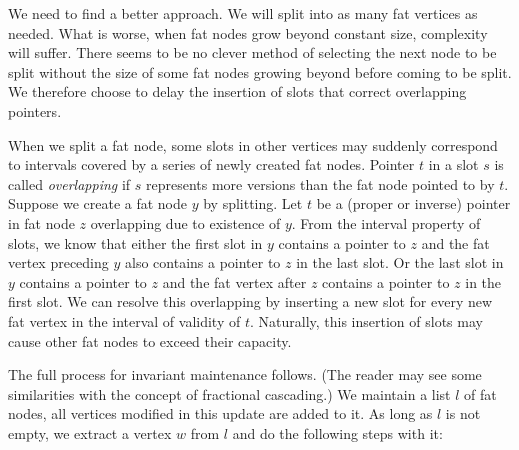 We need to find a better approach. 
We will split into as many fat vertices as needed. 
What is worse, when fat nodes grow beyond constant size, complexity will suffer. 
There seems to be no clever method of selecting the next node to be split without the size of some fat nodes growing beyond  before coming to be split. 
We therefore choose to delay the insertion of slots that correct overlapping pointers.

When we split a fat node, some slots in other vertices may suddenly correspond to intervals covered by a series of newly created fat nodes. Pointer $t$ in a slot $s$ is called \emph{overlapping} if $s$ represents more versions than the fat node pointed to by $t$.
Suppose we create a fat node $y$ by splitting. 
Let $t$ be a (proper or inverse) pointer in fat node $z$ overlapping due to existence of $y$. 
From the interval property of slots, we know that either the first slot in $y$ contains a pointer to $z$ and the fat vertex preceding $y$ also contains a pointer to $z$ in the last slot. 
Or the last slot in $y$ contains a pointer to $z$ and the fat vertex after $z$ contains a pointer to $z$ in the first slot. 
We can resolve this overlapping by inserting a new slot for every new fat vertex in the interval of validity of $t$. 
Naturally, this insertion of slots may cause other fat nodes to exceed their capacity. 

The full process for invariant maintenance follows. 
(The reader may see some similarities with the concept of fractional cascading.) 
We maintain a list $l$ of fat nodes, all vertices modified in this update are added to it. 
As long as $l$ is not empty, we extract a vertex $w$ from $l$ and do the following steps with it:

